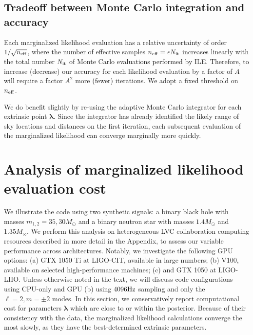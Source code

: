 \documentclass[twocolumn,prd,nofootinbib]{revtex4}
\newcommand\AddedResponse[1]{{\color{blue} {#1}}}
\newcommand\unit[1]{{\rm #1}}
\newcommand\ILE{ILE}
\begin{document}



\subsection{Tradeoff between Monte Carlo integration and accuracy}

Each marginalized likelihood evaluation has a relative uncertainty of order  $1/\sqrt{n_{\rm eff}}$, where the number of
effective samples $n_{\rm eff}=\epsilon N_{\rm it}$ increases linearly with the total number $N_{\rm it}$ of Monte Carlo
evaluations performed by \ILE{}.  Therefore, to increase (decrease) our accuracy for each likelihood evaluation by a factor of $A$
will require a factor $A^2$ more (fewer) iterations.   
%
We adopt a fixed threshold on $n_{\rm eff}$.  


We do benefit slightly by re-using the adaptive Monte Carlo integrator for each extrinsic point $\bm{\lambda}$.  Since the
integrator has already identified the likely range of sky locations and distances on the first iteration, each
subsequent evaluation of the marginalized likelihood can converge marginally more quickly.



\section{Analysis of marginalized likelihood evaluation cost}
\label{sec:demo}

We illustrate the code using two synthetic signals: a binary black hole with masses $m_{1,2}=35,30 M_\odot$ and a binary
neutron star with masses $1.4 M_\odot$ and $1.35 M_\odot$.
 We perform this analysis on heterogeneous LVC collaboration computing resources \AddedResponse{described in more detail
   in the Appendix}, to assess our variable
performance across architectures.  Notably, we investigate the following GPU options: (a) GTX 1050 Ti at LIGO-CIT,
available in large numbers; (b) V100, available on selected high-performance machines; (c) and
GTX 1050 at LIGO-LHO.    Unless otherwise noted in the text, we will discuss code configurations using CPU-only and GPU (b) using
$4096\unit{Hz}$ sampling and only the  $\ell=2, m=\pm 2$ modes.  In this section, we  conservatively report computational cost for
parameters $\bm{\lambda}$ which are close to or within the posterior.  Because of their consistency with the data, 
the marginalized likelihood calculations converge the most slowly, as they have the best-determined extrinsic
parameters.
\end{document}
